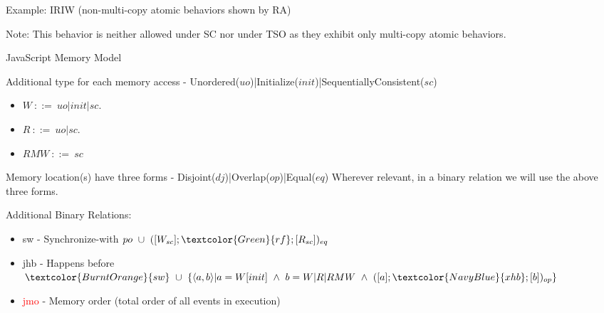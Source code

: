 \documentclass[xcolor={dvipsnames}, notes]{beamer}
\newcommand{\rf}{\textcolor{Green}{rf}}
\newcommand{\xhb}{\textcolor{NavyBlue}{xhb}}
\newcommand{\sw}{\textcolor{BurntOrange}{sw}}
\newcommand{\jhb}{\textcolor{NavyBlue}{jhb}}
\newcommand{\jmo}{\textcolor{Red}{jmo}}
\begin{document}
    \begin{frame}{Example: IRIW (non-multi-copy atomic behaviors shown by RA)}
        
        \begin{figure}
        \end{figure}

        Note: This behavior is neither allowed under SC nor under TSO as they exhibit only multi-copy atomic behaviors.

    \end{frame}



    \begin{frame}{JavaScript Memory Model}
        
        Additional type for each memory access - Unordered($uo$)|Initialize($init$)|SequentiallyConsistent($sc$)
        \begin{itemize}
            \item $W \ ::= \ uo|init|sc $.
            \item $R \ ::= \ uo|sc $.
            \item $RMW \ ::= \ sc$
        \end{itemize}

        Memory location(s) have three forms - Disjoint($dj$)|Overlap($op$)|Equal($eq$)
        Wherever relevant, in a binary relation we will use the above three forms.
        
        Additional Binary Relations:
        \begin{itemize}
            \item {\sw} - Synchronize-with $po \ \cup \ ([W_{sc}];\rf;[R_{sc}])_{eq}$
            \item {\jhb} - Happens before $\sw \ \cup \ \{\langle a,b \rangle | a = W[init] \ \wedge \ b=W|R|RMW \ \wedge \ ([a];\xhb;[b])_{op} \}$
            \item {\jmo} - Memory order (total order of all events in execution) 
        \end{itemize}

        
    \end{frame}
\end{document}
